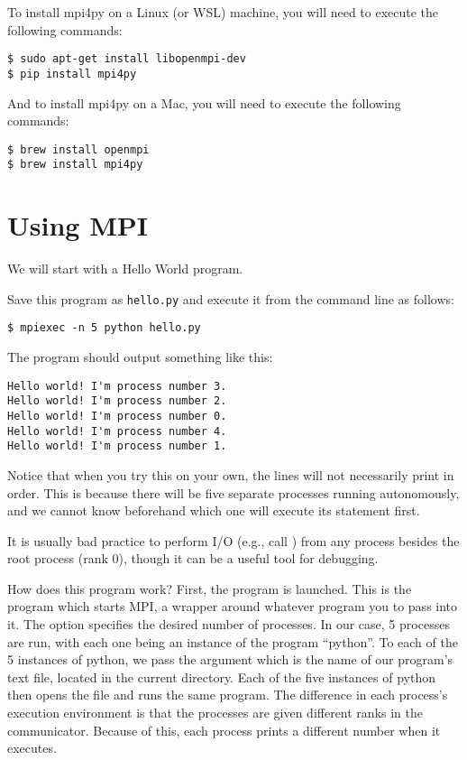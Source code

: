\noindent To install mpi4py on a Linux (or WSL) machine, you will need to execute the following commands:
\begin{lstlisting}
$ sudo apt-get install libopenmpi-dev 
$ pip install mpi4py
\end{lstlisting}

\noindent And to install mpi4py on a Mac, you will need to execute the following commands:
\begin{lstlisting}
$ brew install openmpi
$ brew install mpi4py
\end{lstlisting}

\section*{Using MPI}
We will start with a Hello World program.

Save this program as \texttt{hello.py} and execute it from the command line as follows:
\begin{lstlisting}[style=ShellInput]
$ mpiexec -n 5 python hello.py
\end{lstlisting}
The program should output something like this:
\begin{lstlisting}[style=ShellOutput]
Hello world! I'm process number 3.
Hello world! I'm process number 2.
Hello world! I'm process number 0.
Hello world! I'm process number 4.
Hello world! I'm process number 1.
\end{lstlisting}
Notice that when you try this on your own, the lines will not necessarily print in order.
This is because there will be five separate processes running autonomously, and we cannot know beforehand which one will execute its  statement first.

\begin{warn}
It is usually bad practice to perform I/O (e.g., call ) from any process besides the root process (rank $0$), though it can be a useful tool for debugging.
\end{warn}

How does this program work?
First, the  program is launched.
This is the program which starts MPI, a wrapper around whatever program you to pass into it.
The  option specifies the desired number of processes.
In our case, 5 processes are run, with each one being an instance of the program ``python''.
To each of the 5 instances of python, we pass the argument  which is the name of our program's text file, located in the current directory.
Each of the five instances of python then opens the  file and runs the same program.
The difference in each process's execution environment is that the processes are given different ranks in the communicator.
Because of this, each process prints a different number when it executes.

